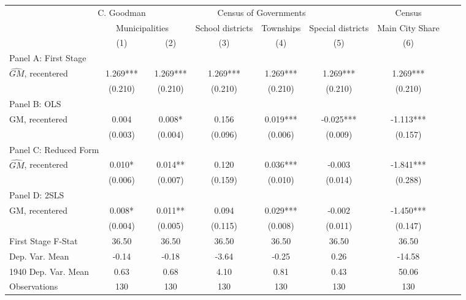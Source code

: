  \begin{tabular}{l*{8}{c}} \toprule
&\multicolumn{1}{c}{C. Goodman}&\multicolumn{4}{c}{Census of Governments}&\multicolumn{1}{c}{Census}\\\cmidrule(lr){2-2}\cmidrule(lr){3-6}\cmidrule(lr){7-7}
&\multicolumn{2}{c}{Municipalities}&\multicolumn{1}{c}{School districts}&\multicolumn{1}{c}{Townships}&\multicolumn{1}{c}{Special districts}&\multicolumn{1}{c}{Main City Share}\\\cmidrule(lr){2-3}\cmidrule(lr){4-6}\cmidrule(lr){7-7}
&\multicolumn{1}{c}{(1)}&\multicolumn{1}{c}{(2)}&\multicolumn{1}{c}{(3)}&\multicolumn{1}{c}{(4)}&\multicolumn{1}{c}{(5)}&\multicolumn{1}{c}{(6)}\\
\cmidrule(lr){1-7}
\multicolumn{6}{l}{Panel A: First Stage}\\
\cmidrule(lr){1-7}
$\widehat{GM}$, recentered&    1.269***&    1.269***&    1.269***&    1.269***&    1.269***&    1.269***\\
                &  (0.210)   &  (0.210)   &  (0.210)   &  (0.210)   &  (0.210)   &  (0.210)   \\
\cmidrule(lr){1-7}
\multicolumn{6}{l}{Panel B: OLS}\\
\cmidrule(lr){1-7}
GM, recentered  &    0.004   &    0.008*  &    0.156   &    0.019***&   -0.025***&   -1.113***\\
                &  (0.003)   &  (0.004)   &  (0.096)   &  (0.006)   &  (0.009)   &  (0.157)   \\
\cmidrule(lr){1-7}
\multicolumn{6}{l}{Panel C: Reduced Form}\\
\cmidrule(lr){1-7}
$\widehat{GM}$, recentered&    0.010*  &    0.014** &    0.120   &    0.036***&   -0.003   &   -1.841***\\
                &  (0.006)   &  (0.007)   &  (0.159)   &  (0.010)   &  (0.014)   &  (0.288)   \\
\cmidrule(lr){1-7}
\multicolumn{6}{l}{Panel D: 2SLS}\\
\cmidrule(lr){1-7}
GM, recentered  &    0.008*  &    0.011** &    0.094   &    0.029***&   -0.002   &   -1.450***\\
                &  (0.004)   &  (0.005)   &  (0.115)   &  (0.008)   &  (0.011)   &  (0.147)   \\
\midrule
First Stage F-Stat&    36.50   &    36.50   &    36.50   &    36.50   &    36.50   &    36.50   \\
Dep. Var. Mean  &    -0.14   &    -0.18   &    -3.64   &    -0.25   &     0.26   &   -14.58   \\
1940 Dep. Var. Mean&     0.63   &     0.68   &     4.10   &     0.81   &     0.43   &    50.06   \\
Observations    &      130   &      130   &      130   &      130   &      130   &      130   \\
       \bottomrule \end{tabular}

